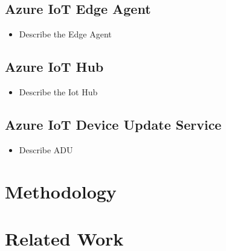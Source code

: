 \subsection{Azure IoT Edge Agent}
\begin{tcolorbox}[title=TODO]
    \begin{itemize}
        \item Describe the Edge Agent
    \end{itemize}
\end{tcolorbox}

\subsection{Azure IoT Hub}
\begin{tcolorbox}[title=TODO]
    \begin{itemize}
        \item Describe the Iot Hub
    \end{itemize}
\end{tcolorbox}

\subsection{Azure IoT Device Update Service}
\begin{tcolorbox}[title=TODO]
    \begin{itemize}
        \item Describe ADU
    \end{itemize}
\end{tcolorbox}



\section{Methodology}
\section{Related Work}
